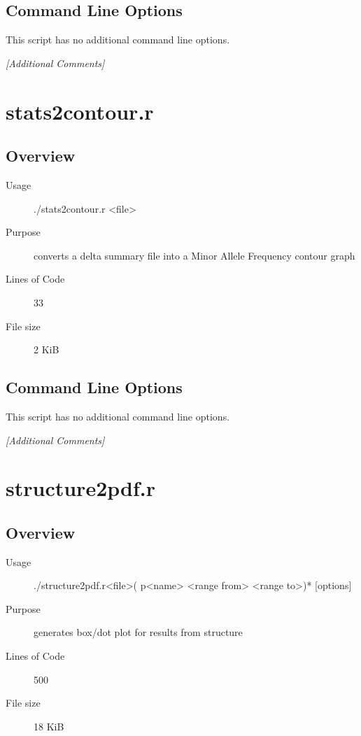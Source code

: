 \subsection{Command Line Options}
\label{sec:snpchip2gtmap.r-command-line}

This script has no additional command line options.

\emph{[Additional Comments]}

\section{stats2contour.r}
\label{sec:stats2contour.r}

\subsection{Overview}
\label{sec:stats2contour.r-overview}

\begin{description}
\item[Usage] ./stats2contour.r <file>
\item[Purpose] converts a delta summary file into a Minor Allele Frequency contour graph
\item[Lines of Code] 33
\item[File size] 2 KiB
\end{description}

\subsection{Command Line Options}
\label{sec:stats2contour.r-command-line}

This script has no additional command line options.

\emph{[Additional Comments]}

\section{structure2pdf.r}
\label{sec:structure2pdf.r}

\subsection{Overview}
\label{sec:structure2pdf.r-overview}

\begin{description}
\item[Usage] ./structure2pdf.r<file>( p<name> <range from> <range to>)* [options]
\item[Purpose] generates box/dot plot for results from structure
\item[Lines of Code] 500
\item[File size] 18 KiB
\end{description}


